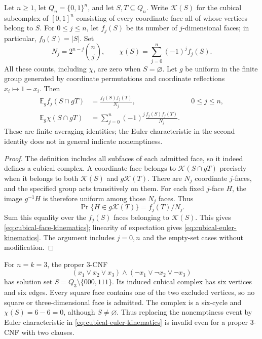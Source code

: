 \begin{proposition}
\label{prop:cubical-kinematics}
Let $n\ge1$, let $Q_n=\{0,1\}^n$, and let $S,T\subseteq Q_n$.
Write $\mathcal K(S)$ for the cubical subcomplex of $[0,1]^n$
consisting of every coordinate face all of whose vertices belong to $S$.
For $0\le j\le n$, let $f_j(S)$ be its number of $j$-dimensional faces;
in particular, $f_0(S)=|S|$. Set
\[
 N_j=2^{n-j}\binom nj,
 \qquad
 \chi(S)=\sum_{j=0}^n(-1)^j f_j(S).
\]
All these counts, including $\chi$, are zero when $S=\varnothing$.
Let $g$ be uniform in the finite group generated by coordinate permutations
and coordinate reflections $x_i\mapsto1-x_i$. Then
\begin{align}
 \mathbb E_g f_j(S\cap gT)&=\frac{f_j(S)f_j(T)}{N_j},
       &&0\le j\le n, \label{eq:cubical-face-kinematics}\\
 \mathbb E_g\chi(S\cap gT)&=
       \sum_{j=0}^n(-1)^j\frac{f_j(S)f_j(T)}{N_j}.
       \label{eq:cubical-euler-kinematics}
\end{align}
These are finite averaging identities; the Euler characteristic in the
second identity does not in general indicate nonemptiness.
\end{proposition}
\begin{proof}
The definition includes all subfaces of each admitted face, so it indeed
defines a cubical complex. A coordinate face belongs to $\mathcal K(S\cap
gT)$ precisely when it belongs to both $\mathcal K(S)$ and $g\mathcal K(T)$.
There are $N_j$ coordinate $j$-faces, and the specified group acts transitively
on them. For each fixed $j$-face $H$, the image $g^{-1}H$ is therefore
uniform among those $N_j$ faces. Thus
\[
 \Pr\{H\in g\mathcal K(T)\}=f_j(T)/N_j.
\]
Sum this equality over the $f_j(S)$ faces belonging to $\mathcal K(S)$.
This gives \eqref{eq:cubical-face-kinematics}; linearity of expectation
gives \eqref{eq:cubical-euler-kinematics}. The argument includes $j=0,n$
and the empty-set cases without modification.
\end{proof}

\begin{example}
\label{ex:sat-cycle}
For $n=k=3$, the proper $3$-CNF
\[
 (x_1\lor x_2\lor x_3)\land
 (\neg x_1\lor\neg x_2\lor\neg x_3)
\]
has solution set $S=Q_3\setminus\{000,111\}$. Its induced cubical
complex has six vertices and six edges. Every square face contains one
of the two excluded vertices, so no square or three-dimensional face
is admitted. The complex is a six-cycle and
$\chi(S)=6-6=0$, although $S\ne\varnothing$.
Thus replacing the nonemptiness event by Euler characteristic in
\eqref{eq:cubical-euler-kinematics} is invalid even for a proper $3$-CNF
with two clauses.
\end{example}

